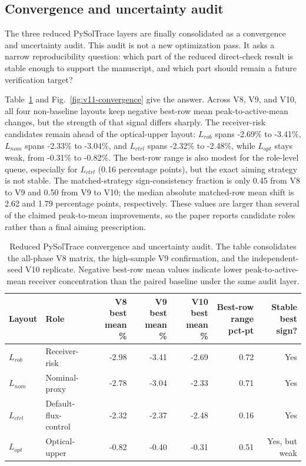 \documentclass[final,3p,times]{elsarticle}
\begin{document}
\subsection{Convergence and uncertainty audit}
The three reduced PySolTrace layers are finally consolidated as a convergence and uncertainty audit. This audit is not a new optimization pass. It asks a narrow reproducibility question: which part of the reduced direct-check result is stable enough to support the manuscript, and which part should remain a future verification target?

Table~\ref{tab:v11-convergence} and Fig.~\ref{fig:v11-convergence} give the answer. Across V8, V9, and V10, all four non-baseline layouts keep negative best-row mean peak-to-active-mean changes, but the strength of that signal differs sharply. The receiver-risk candidates remain ahead of the optical-upper layout: $L_{rob}$ spans -2.69\% to -3.41\%, $L_{nom}$ spans -2.33\% to -3.04\%, and $L_{ctrl}$ spans -2.32\% to -2.48\%, while $L_{opt}$ stays weak, from -0.31\% to -0.82\%. The best-row range is also modest for the role-level queue, especially for $L_{ctrl}$ (0.16 percentage points), but the exact aiming strategy is not stable. The matched-strategy sign-consistency fraction is only 0.45 from V8 to V9 and 0.50 from V9 to V10; the median absolute matched-row mean shift is 2.62 and 1.79 percentage points, respectively. These values are larger than several of the claimed peak-to-mean improvements, so the paper reports candidate roles rather than a final aiming prescription.

\begin{table}[t]
\centering
\caption{Reduced PySolTrace convergence and uncertainty audit. The table consolidates the all-phase V8 matrix, the high-sample V9 confirmation, and the independent-seed V10 replicate. Negative best-row mean values indicate lower peak-to-active-mean receiver concentration than the paired baseline under the same audit layer.}
\label{tab:v11-convergence}
\scriptsize
\begin{tabular*}{\textwidth}{@{\extracolsep{\fill}}llrrrrr@{}}
\toprule
Layout & Role & V8 best mean \% & V9 best mean \% & V10 best mean \% & Best-row range pct-pt & Stable best sign? \\
\midrule
$L_{rob}$ & Receiver-risk & -2.98 & -3.41 & -2.69 & 0.72 & Yes \\
$L_{nom}$ & Nominal-proxy & -2.78 & -3.04 & -2.33 & 0.71 & Yes \\
$L_{ctrl}$ & Default-flux-control & -2.32 & -2.37 & -2.48 & 0.16 & Yes \\
$L_{opt}$ & Optical-upper & -0.82 & -0.40 & -0.31 & 0.51 & Yes, but weak \\
\bottomrule
\end{tabular*}
\end{table}
\end{document}

